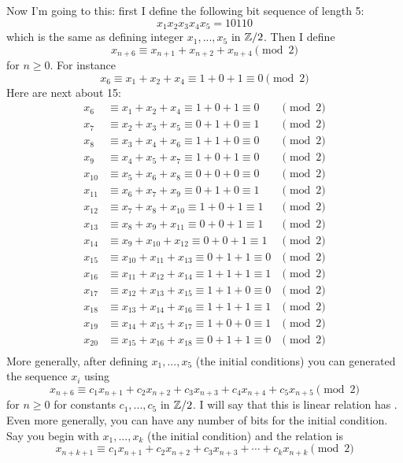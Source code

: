 Now I'm going to this:
first I define the following bit sequence of length 5:
\[
  x_1x_2x_3x_4x_5 = 10110
\]
which is the same as defining integer $x_1, ..., x_5$ in $\mathbb Z/2$.
Then I define
\[
  x_{n + 6} \equiv x_{n+1} + x_{n+2} + x_{n+4} \pmod{2}
\]
for $n \geq 0$.
For instance
\[
  x_{6} \equiv x_{1} + x_{2} + x_{4} \equiv 1 + 0 + 1 \equiv 0 \pmod{2} 
\]
Here are next about 15: 
\begin{align*}
  x_{6} &\equiv x_{1} + x_{2} + x_{4} \equiv 1 + 0 + 1 \equiv 0  & \pmod{2} \\
  x_{7} &\equiv x_{2} + x_{3} + x_{5} \equiv 0 + 1 + 0 \equiv 1  & \pmod{2} \\
  x_{8} &\equiv x_{3} + x_{4} + x_{6} \equiv 1 + 1 + 0 \equiv 0  & \pmod{2} \\
  x_{9} &\equiv x_{4} + x_{5} + x_{7} \equiv 1 + 0 + 1 \equiv 0  & \pmod{2} \\
  x_{10} &\equiv x_{5} + x_{6} + x_{8} \equiv 0 + 0 + 0 \equiv 0 & \pmod{2} \\
  x_{11} &\equiv x_{6} + x_{7} + x_{9} \equiv 0 + 1 + 0 \equiv 1 & \pmod{2} \\
  x_{12} &\equiv x_{7} + x_{8} + x_{10} \equiv 1 + 0 + 1 \equiv 1 & \pmod{2} \\
  x_{13} &\equiv x_{8} + x_{9} + x_{11} \equiv 0 + 0 + 1 \equiv 1 & \pmod{2} \\
  x_{14} &\equiv x_{9} + x_{10} + x_{12} \equiv 0 + 0 + 1 \equiv 1 & \pmod{2} \\
  x_{15} &\equiv x_{10} + x_{11} + x_{13} \equiv 0 + 1 + 1 \equiv 0 & \pmod{2} \\
  x_{16} &\equiv x_{11} + x_{12} + x_{14} \equiv 1 + 1 + 1 \equiv 1 & \pmod{2} \\
  x_{17} &\equiv x_{12} + x_{13} + x_{15} \equiv 1 + 1 + 0 \equiv 0 & \pmod{2} \\
  x_{18} &\equiv x_{13} + x_{14} + x_{16} \equiv 1 + 1 + 1 \equiv 1 & \pmod{2} \\
  x_{19} &\equiv x_{14} + x_{15} + x_{17} \equiv 1 + 0 + 0 \equiv 1 & \pmod{2} \\
  x_{20} &\equiv x_{15} + x_{16} + x_{18} \equiv 0 + 1 + 1 \equiv 0 & \pmod{2} \\
\end{align*}
More generally, after defining $x_1, ..., x_5$ (the initial conditions) you can
generated the sequence $x_i$ using
\[
  x_{n + 6} \equiv c_1 x_{n+1} + c_2 x_{n+2} + c_3 x_{n+3} + c_4x_{n+4} + c_5x_{n+5} \pmod{2}
\]
for $n \geq 0$ for constants $c_1, ..., c_5$ in $\mathbb Z/2$.
I will say that this is linear relation has .
Even more generally, you can have any number of bits for the initial condition.
Say you begin with $x_1, ..., x_k$ (the initial condition) and
the relation is
\[
  x_{n + k + 1} \equiv c_1 x_{n+1} + c_2 x_{n+2} + c_3 x_{n+3} + \cdots + c_kx_{n+k} \pmod{2}
\]

